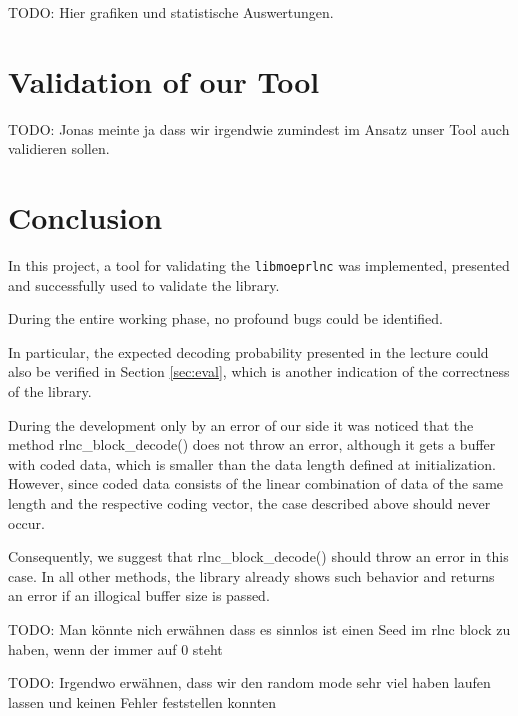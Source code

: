 \documentclass[a4paper,english,10pt]{tumarticle}
\begin{document}
TODO: Hier grafiken und statistische Auswertungen.


\section{Validation of our Tool}\label{eval}
TODO: Jonas meinte ja dass wir irgendwie zumindest im Ansatz unser Tool auch validieren sollen. 

\section{Conclusion}\label{eval}
In this project, a tool for validating the \texttt{libmoeprlnc} was implemented, presented and successfully used 
to validate the library. 

During the entire working phase, no profound bugs could be identified.

In particular, the expected decoding probability presented in the lecture 
could also be verified in Section \ref{sec:eval}, which is another indication of the correctness of the library.

During the development only by an error of our side it was noticed that the method rlnc\_block\_decode() does not 
throw an error, although it gets a buffer with coded data, which is smaller than the data length defined 
at initialization. However, since coded data consists of the linear combination of data of the same length and 
the respective coding vector, the case described above should never occur.

Consequently, we suggest that rlnc\_block\_decode() should throw an error in this case. In all other methods, 
the library already shows such behavior and returns an error if an illogical buffer size is passed.

TODO: Man könnte nich erwähnen dass es sinnlos ist einen Seed im rlnc block zu haben, wenn der immer auf 0 steht

TODO: Irgendwo erwähnen, dass wir den random mode sehr viel haben laufen lassen und keinen Fehler feststellen konnten
\end{document}
